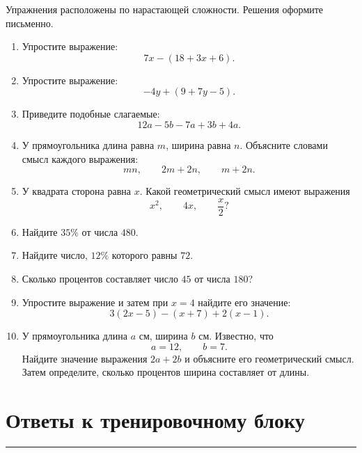 \documentclass[a4paper,12pt]{article}
\newcommand{\sectionline}{\vspace{-0.35em}\noindent\textcolor{accent}{\rule{\linewidth}{0.6pt}}\vspace{0.35em}}
\begin{document}
Упражнения расположены по нарастающей сложности.
Решения оформите письменно.

\begin{enumerate}

  \item Упростите выражение:
  \[
  7x-(18+3x+6).
  \]

  \item Упростите выражение:
  \[
  -4y+(9+7y-5).
  \]

  \item Приведите подобные слагаемые:
  \[
  12a-5b-7a+3b+4a.
  \]

  \item У прямоугольника длина равна $m$, ширина равна $n$.
  Объясните словами смысл каждого выражения:
  \[
  mn,
  \qquad
  2m+2n,
  \qquad
  m+2n.
  \]

  \item У квадрата сторона равна $x$.
  Какой геометрический смысл имеют выражения
  \[
  x^2,
  \qquad
  4x,
  \qquad
  \frac{x}{2}?
  \]

  \item Найдите $35\%$ от числа $480$.

  \item Найдите число, $12\%$ которого равны $72$.

  \item Сколько процентов составляет число $45$ от числа $180$?

  \item Упростите выражение и затем при $x=4$ найдите его значение:
  \[
  3(2x-5)-(x+7)+2(x-1).
  \]

  \item У прямоугольника длина $a$ см, ширина $b$ см.
  Известно, что
  \[
  a=12,
  \qquad
  b=7.
  \]
  Найдите значение выражения $2a+2b$ и объясните его геометрический смысл.
  Затем определите, сколько процентов ширина составляет от длины.

\end{enumerate}

\clearpage

\section*{Ответы к тренировочному блоку}
\sectionline
\end{document}
